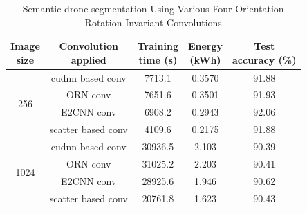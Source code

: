 \begin{table}[ht]
\centering
\caption{Semantic drone segmentation Using Various Four-Orientation Rotation-Invariant Convolutions}
\renewcommand{\arraystretch}{1.2}
\begin{tabular}{c|c|c|c|c} 
\hline\hline
\shortstack{Image\\size} & 
\shortstack{Convolution\\applied} & 
\shortstack{Training\\time (s)} &  
\shortstack{Energy\\(kWh)} &  
\shortstack{Test\\accuracy (\%)} \\ 
\hline\hline
\multirow{4}{*}{256} 
 & cudnn based conv    &7713.1  &0.3570 &91.88  \\ \cline{2-5}
 & ORN conv    &7651.6  &0.3501  &91.93  \\ \cline{2-5}
 & E2CNN conv    &6908.2 &0.2943  &92.06  \\ \cline{2-5}
 & scatter based conv  &4109.6  &0.2175 &91.88  \\
\hline
\multirow{4}{*}{1024} 
  & cudnn based conv    &30936.5  &2.103 &90.39  \\ \cline{2-5}
 & ORN conv    &31025.2  & 2.203  &90.41  \\ \cline{2-5}
 & E2CNN conv    &28925.6 &1.946  &90.62  \\ \cline{2-5}
 & scatter based conv  &20761.8  & 1.623&90.43  \\
\hline
\end{tabular}
\label{tab:four-drone}
\end{table}

